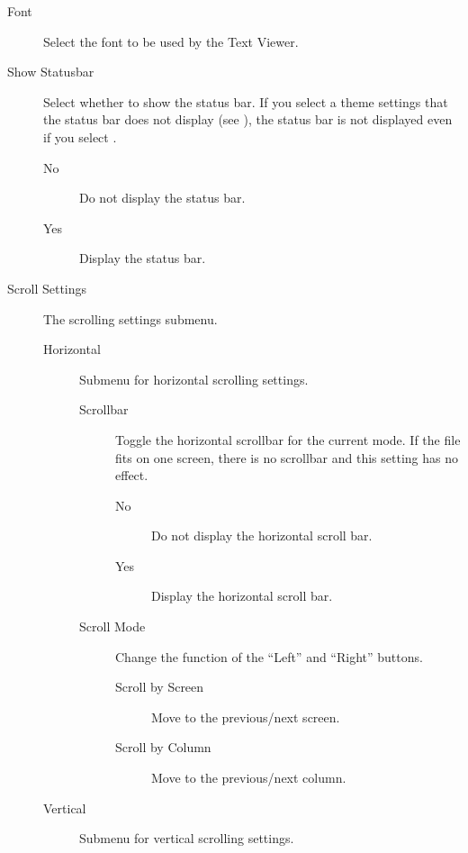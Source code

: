\begin{description}
\begin{description}
    \item[Font] Select the font to be used by the Text Viewer.
    \item[Show Statusbar] Select whether to show the status bar. If you select
         a theme settings that the status bar does not display (see
         ), the status bar is not
         displayed even if you select .
        \begin{description}
            \item[No] Do not display the status bar.
            \item[Yes] Display the status bar.
        \end{description}
    \item[Scroll Settings] The scrolling settings submenu.
        \begin{description}
            \item[Horizontal] Submenu for horizontal scrolling settings.
                \begin{description}
                    \item[Scrollbar] Toggle the horizontal scrollbar for the
                    current mode. If the file fits on one screen, there is no
                    scrollbar and this setting has no effect.
                        \begin{description}
                            \item[No] Do not display the horizontal scroll bar.
                            \item[Yes] Display the horizontal scroll bar.
                        \end{description}
                    \item[Scroll Mode] Change the function of the ``Left'' and
    ``Right'' buttons.
                        \begin{description}
                            \item[Scroll by Screen] Move to the previous/next
                            screen.
                            \item[Scroll by Column] Move to the previous/next
                            column.
                        \end{description}
                \end{description}
            \item[Vertical] Submenu for vertical scrolling settings.
                \begin{description}

\end{description}
\end{description}
\end{description}
\end{description}
